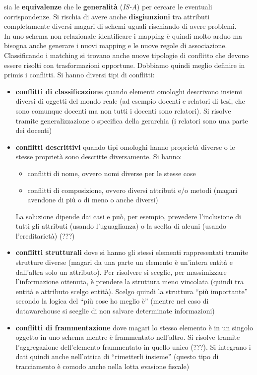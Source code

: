 \documentclass[a4paper,12pt, oneside]{book}
\begin{document}
sia le \textbf{equivalenze} che le \textbf{generalità} (\textit{IS-A}) per
cercare le eventuali corrispondenze. Si rischia di avere anche
\textbf{disgiunzioni} tra attributi completamente diversi magari di schemi
uguali rischiando di avere problemi.\\
In uno schema non relazionale identificare i mapping è quindi molto arduo ma
bisogna anche generare i nuovi mapping e le nuove regole di associazione.\\
Classificando i matching si trovano anche nuove tipologie di conflitto che
devono essere risolti con trasformazioni opportune. Dobbiamo quindi meglio
definire in primis i conflitti. Si hanno diversi tipi di conflitti:
\begin{itemize}
  \item \textbf{conflitti di classificazione} quando elementi omologhi
  descrivono insiemi diversi di oggetti del mondo reale (ad esempio docenti e
  relatori di tesi, che sono comunque docenti ma non tutti i docenti sono
  relatori). Si risolve tramite generalizzazione o specifica della gerarchia (i
  relatori sono una parte dei docenti)
  \item \textbf{conflitti descrittivi} quando tipi omologhi hanno proprietà
  diverse o le stesse proprietà sono descritte diversamente. Si hanno:
  \begin{itemize}
    \item conflitti di nome, ovvero nomi diverse per le stesse cose
    \item conflitti di composizione, ovvero diversi attributi e/o metodi (magari
    avendone di più o di meno o anche diversi)
  \end{itemize}
  La soluzione dipende dai casi e può, per esempio, prevedere l'inclusione di
  tutti gli attributi (usando l'uguaglianza) o la scelta di alcuni (usando
  l'ereditarietà) (???)
  \item \textbf{conflitti strutturali} dove si hanno gli stessi elementi
  rappresentati tramite strutture diverse (magari da una parte un elemento è
  un'intera entità e dall'altra solo un attributo). Per risolvere si sceglie,
  per massimizzare l'informazione ottenuta, è prendere la struttura meno
  vincolata (quindi tra entità e attributo scelgo entità). Scelgo quindi la
  struttura ``più importante'' secondo la logica del ``più cose ho meglio è''
  (mentre nel caso di datawarehouse si sceglie di non salvare determinate
  informazioni) 
  \item \textbf{conflitti di frammentazione} dove magari lo stesso elemento è in
  un singolo oggetto in uno schema mentre è frammentato nell'altro. Si risolve
  tramite l'aggregazione dell'elemento frammentato in quello unico (???). Si
  integrano i dati quindi anche nell'ottica di ``rimetterli insieme'' (questo
  tipo di tracciamento è comodo anche nella lotta evasione fiscale)
\end{itemize}
\end{document}

